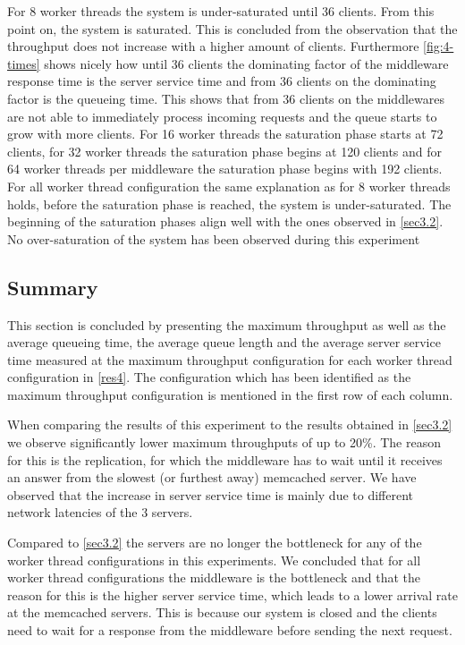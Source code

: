 \documentclass[11pt,a4paper]{article}
\begin{document}
For 8 worker threads the system is under-saturated until 36 clients. From this point on, the system is saturated. This is concluded from the observation that the throughput does not increase with a higher amount of clients. Furthermore \autoref{fig:4-times} shows nicely how until 36 clients the dominating factor of the middleware response time is the server service time and from 36 clients on the dominating factor is the queueing time. This shows that from 36 clients on the middlewares are not able to immediately process incoming requests and the queue starts to grow with more clients.
For 16 worker threads the saturation phase starts at 72 clients, for 32 worker threads the saturation phase begins at 120 clients and for 64 worker threads per middleware the saturation phase begins with 192 clients. For all worker thread configuration the same explanation as for 8 worker threads holds, before the saturation phase is reached, the system is under-saturated. The beginning of the saturation phases align well with the ones observed in \autoref{sec3.2}.
No over-saturation of the system has been observed during this experiment

\subsection{Summary}
This section is concluded by presenting the maximum throughput as well as the average queueing time, the average queue length and the average server service time measured at the maximum throughput configuration for each worker thread configuration in \autoref{res4}. The configuration which has been identified as the maximum throughput configuration is mentioned in the first row of each column.

When comparing the results of this experiment to the results obtained in \autoref{sec3.2} we observe significantly lower maximum throughputs of up to 20\%. The reason for this is the replication, for which the middleware has to wait until it receives an answer from the slowest (or furthest away) memcached server. We have observed that the increase in server service time is mainly due to different network latencies of the 3 servers.

Compared to \autoref{sec3.2} the servers are no longer the bottleneck for any of the worker thread configurations in this experiments. We concluded that for all worker thread configurations the middleware is the bottleneck and that the reason for this is the higher server service time, which leads to a lower arrival rate at the memcached servers. This is because our system is closed and the clients need to wait for a response from the middleware before sending the next request.
\end{document}
